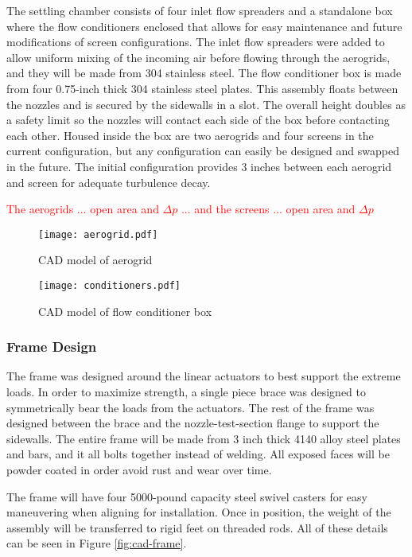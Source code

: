 The settling chamber consists of four inlet flow spreaders and a standalone box where the flow conditioners enclosed that allows for easy maintenance and future modifications of screen configurations. The inlet flow spreaders were added to allow uniform mixing of the incoming air before flowing through the aerogrids, and they will be made from 304 stainless steel. The flow conditioner box is made from four 0.75-inch thick 304 stainless steel plates. This assembly floats between the nozzles and is secured by the sidewalls in a slot. The overall height doubles as a safety limit so the nozzles will contact each side of the box before contacting each other. Housed inside the box are two aerogrids and four screens in the current configuration, but any configuration can easily be designed and swapped in the future. The initial configuration provides 3 inches between each aerogrid and screen for adequate turbulence decay. 

\textcolor{red}{The aerogrids ... open area and $\Delta p$ ... and the screens ... open area and $\Delta p$}

\begin{figure}[ht!]
    \centering
    \texttt{[image: aerogrid.pdf]}
    \caption{CAD model of aerogrid}
    \label{fig:aerogrid}
\end{figure}

\begin{figure}[ht!]
    \centering
    \texttt{[image: conditioners.pdf]}
    \caption{CAD model of flow conditioner box}
    \label{fig:conditioners}
\end{figure}

\subsubsection*{Frame Design}

The frame was designed around the linear actuators to best support the extreme loads. In order to maximize strength, a single piece brace was designed to symmetrically bear the loads from the actuators. The rest of the frame was designed between the brace and the nozzle-test-section flange to support the sidewalls. The entire frame will be made from 3 inch thick 4140 alloy steel plates and bars, and it all bolts together instead of welding. All exposed faces will be powder coated in order avoid rust and wear over time. 

The frame will have four 5000-pound capacity steel swivel casters for easy maneuvering when aligning for installation. Once in position, the weight of the assembly will be transferred to rigid feet on threaded rods. All of these details can be seen in Figure \ref{fig:cad-frame}.

